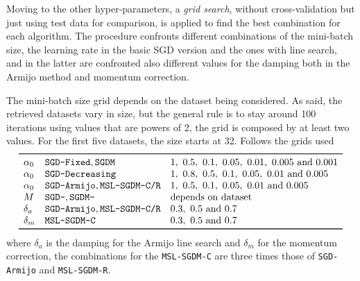 Moving to the other hyper-parameters, a \emph{grid search}, without cross-validation but just using test data for comparison, is applied to find the best combination for each algorithm. The procedure confronts different combinations of the mini-batch size, the learning rate in the basic SGD version and the ones with line search, and in the latter are confronted also different values for the damping both in the Armijo method and momentum correction.

The mini-batch size grid depends on the dataset being considered. As said, the retrieved datasets vary in size, but the general rule is to stay around 100 iterations using values that are powers of 2, the grid is composed by at least two values. For the first five datasets, the size starts at 32. Follows the grids used
\[
\begin{array}{lll}
\toprule
\alpha_0 & \text{\texttt{SGD-Fixed}}, \text{\texttt{SGDM}} & \numlist{1; 0.5; 0.1; 0.05; 0.01; 0.005; 0.001} \\
\alpha_0 & \text{\texttt{SGD-Decreasing}} & \numlist{1; 0.8; 0.5; 0.1; 0.05; 0.01; 0.005} \\
\alpha_0 & \text{\texttt{SGD-Armijo}}, \text{\texttt{MSL-SGDM-C/R}} & \numlist{1; 0.5; 0.1; 0.05; 0.01; 0.005} \\
M & \text{\texttt{SGD-}}, \text{\texttt{SGDM-}} & \text{depends on dataset} \\
\delta_a & \text{\texttt{SGD-Armijo}}, \text{\texttt{MSL-SGDM-C/R}} & \numlist{0.3;0.5;0.7} \\
\delta_m & \text{\texttt{MSL-SGDM-C}} & \numlist{0.3; 0.5; 0.7} \\
\bottomrule
\end{array}
\]
where $\delta_a$ is the damping for the Armijo line search and $\delta_m$ for the momentum correction, the combinations for the \texttt{MSL-SGDM-C} are three times those of \texttt{SGD-Armijo} and \texttt{MSL-SGDM-R}.


